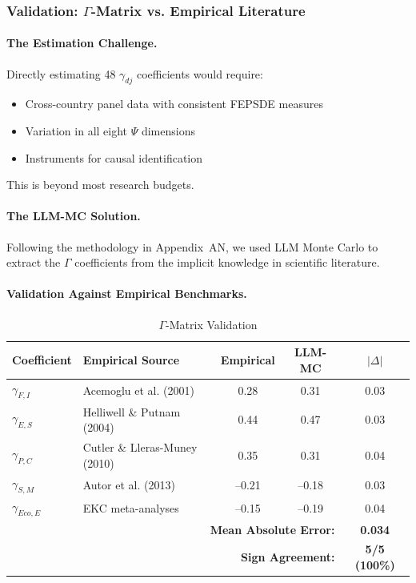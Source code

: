 \subsubsection{Validation: $\Gamma$-Matrix vs. Empirical Literature}

\paragraph{The Estimation Challenge.}
Directly estimating 48 $\gamma_{dj}$ coefficients would require:
\begin{itemize}
\item Cross-country panel data with consistent FEPSDE measures
\item Variation in all eight $\Psi$ dimensions
\item Instruments for causal identification
\end{itemize}

This is beyond most research budgets.

\paragraph{The LLM-MC Solution.}
Following the methodology in Appendix~AN, we used LLM Monte Carlo to extract 
the $\Gamma$ coefficients from the implicit knowledge in scientific literature.

\paragraph{Validation Against Empirical Benchmarks.}

\begin{table}[htbp]
\centering
\caption{$\Gamma$-Matrix Validation}
\label{tab:gamma-validation}
\renewcommand{\arraystretch}{1.3}
\begin{tabular}{@{}llccc@{}}
\toprule
\textbf{Coefficient} & \textbf{Empirical Source} & \textbf{Empirical} & \textbf{LLM-MC} & \textbf{$|\Delta|$} \\
\midrule
$\gamma_{F,I}$ & Acemoglu et al. (2001) & 0.28 & 0.31 & 0.03 \\
$\gamma_{E,S}$ & Helliwell \& Putnam (2004) & 0.44 & 0.47 & 0.03 \\
$\gamma_{P,C}$ & Cutler \& Lleras-Muney (2010) & 0.35 & 0.31 & 0.04 \\
$\gamma_{S,M}$ & Autor et al. (2013) & --0.21 & --0.18 & 0.03 \\
$\gamma_{Eco,E}$ & EKC meta-analyses & --0.15 & --0.19 & 0.04 \\
\midrule
\multicolumn{4}{r}{\textbf{Mean Absolute Error:}} & \textbf{0.034} \\
\multicolumn{4}{r}{\textbf{Sign Agreement:}} & \textbf{5/5 (100\%)} \\
\bottomrule
\end{tabular}
\end{table}

